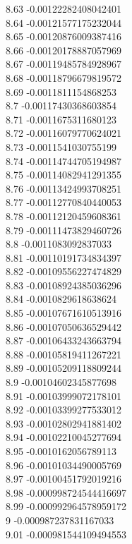 {8.63	-0.00122282408042401\\
8.64	-0.00121577175232044\\
8.65	-0.00120876009387416\\
8.66	-0.00120178887057969\\
8.67	-0.00119485784928967\\
8.68	-0.00118796679819572\\
8.69	-0.0011811154868253\\
8.7	-0.00117430368603854\\
8.71	-0.0011675311680123\\
8.72	-0.00116079770624021\\
8.73	-0.0011541030755199\\
8.74	-0.00114744705194987\\
8.75	-0.00114082941291355\\
8.76	-0.00113424993708251\\
8.77	-0.00112770840440053\\
8.78	-0.00112120459608361\\
8.79	-0.00111473829460726\\
8.8	-0.0011083092837033\\
8.81	-0.00110191734834397\\
8.82	-0.00109556227474829\\
8.83	-0.00108924385036296\\
8.84	-0.0010829618638624\\
8.85	-0.00107671610513916\\
8.86	-0.00107050636529442\\
8.87	-0.00106433243663794\\
8.88	-0.00105819411267221\\
8.89	-0.00105209118809244\\
8.9	-0.00104602345877698\\
8.91	-0.00103999072178101\\
8.92	-0.00103399277533012\\
8.93	-0.00102802941881402\\
8.94	-0.00102210045277694\\
8.95	-0.0010162056789113\\
8.96	-0.00101034490005769\\
8.97	-0.00100451792019216\\
8.98	-0.000998724544416697\\
8.99	-0.000992964578959172\\
9	-0.000987237831167033\\
9.01	-0.000981544109494553\\
}
